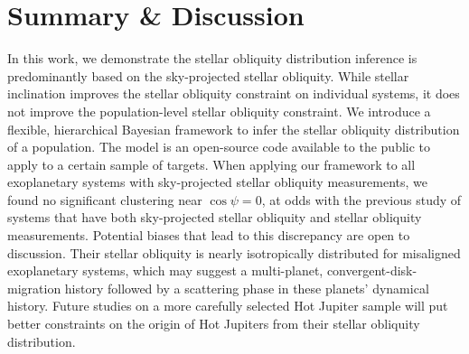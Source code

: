 \documentclass[twocolumn,times]{aastex631}
\newcommand{\numistar}{62\xspace}
\begin{document}
\section{Summary \& Discussion}

In this work, we demonstrate the stellar obliquity distribution inference is predominantly based on the sky-projected stellar obliquity. While stellar inclination improves the stellar obliquity constraint on individual systems, it does not improve the population-level stellar obliquity constraint. 
We introduce a flexible, hierarchical Bayesian framework to infer the stellar obliquity distribution of a population. The model is an open-source code available to the public to apply to a certain sample of targets.
When applying our framework to all exoplanetary systems with sky-projected stellar obliquity measurements, we found no significant clustering near $\cos{\psi} = 0$, at odds with the previous study of systems that have both sky-projected stellar obliquity and stellar obliquity measurements. Potential biases that lead to this discrepancy are open to discussion. 
Their stellar obliquity is nearly isotropically distributed for misaligned exoplanetary systems, which may suggest a multi-planet, convergent-disk-migration history followed by a scattering phase in these planets' dynamical history. Future studies on a more carefully selected Hot Jupiter sample will put better constraints on the origin of Hot Jupiters from their stellar obliquity distribution.


\end{document}
